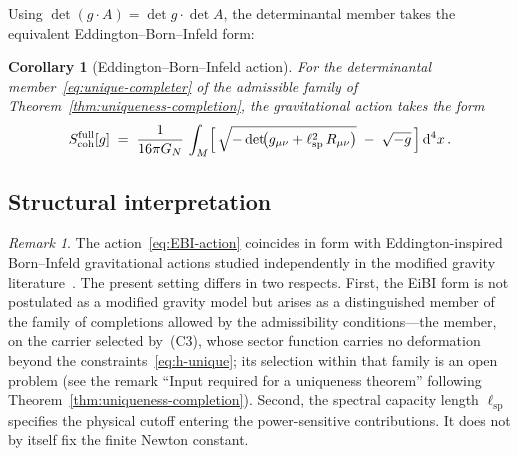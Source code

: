 \documentclass[pdflatex,sn-mathphys-num]{sn-jnl} %
\theoremstyle{remark}
\newtheorem*{remark}{Remark}
\theoremstyle{plain}
\newtheorem{corollary}[theorem]{Corollary}
\begin{document}
    Using $\det(g \cdot A) = \det g \cdot \det A$, the
    determinantal member takes the equivalent
    Eddington--Born--Infeld form:

    \begin{corollary}[Eddington--Born--Infeld action]
      \label{cor:EBI}
      For the determinantal
      member~\eqref{eq:unique-completer} of the admissible
      family of Theorem~\ref{thm:uniqueness-completion},
      the gravitational action takes the form
      \begin{equation}\label{eq:EBI-action}
        S_{\mathrm{coh}}^{\mathrm{full}}[g]
        \;=\;
        \frac{1}{16\pi G_N}\,
        \int_{M}
        \Bigl[\,
        \sqrt{-\det\!\bigl(
        g_{\mu\nu}
        + \ell_{\mathrm{sp}}^{2}\, R_{\mu\nu}
        \bigr)}
        \;-\;
        \sqrt{-g}
        \,\Bigr]\,
        \mathrm{d}^4 x\,.
      \end{equation}
    \end{corollary}

  \subsection{Structural interpretation}
    \label{subsec:UV-interpretation}

    \begin{remark}
      The action~\eqref{eq:EBI-action} coincides in form
      with Eddington-inspired Born--Infeld gravitational
      actions studied independently in the modified gravity
      literature~\cite{DeserGibbons1998,BanadosFerreira2010}.
      The present setting differs in two respects.
      First, the EiBI form is not postulated as a modified
      gravity model but arises as a distinguished member of
      the family of completions allowed by the admissibility
      conditions---the member, on the carrier selected by~(C3), whose sector
      function carries no deformation beyond the
      constraints~\eqref{eq:h-unique}; its selection within
      that family is an open problem
      (see the remark ``Input required for a uniqueness theorem'' following
      Theorem~\ref{thm:uniqueness-completion}).
      Second, the spectral capacity length $\ell_{\mathrm{sp}}$ specifies the physical cutoff entering the
      power-sensitive contributions.
      It does not by itself fix the finite Newton constant.
    \end{remark}
\end{document}

